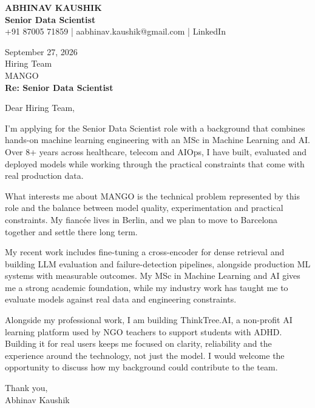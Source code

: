 \documentclass[10pt,a4paper]{article}
\begin{document}
\begin{center}
{\Large\bfseries ABHINAV KAUSHIK}\\[2pt]
{\bfseries Senior Data Scientist}\\[2pt]
+91 87005 71859 \quad | \quad aabhinav.kaushik@gmail.com \quad | \quad LinkedIn
\end{center}
\vspace{8pt}
September 27, 2026\\[6pt]
Hiring Team\\
MANGO\\[4pt]
\textbf{Re: Senior Data Scientist}

Dear Hiring Team,

I’m applying for the Senior Data Scientist role with a background that combines hands-on machine learning engineering with an MSc in Machine Learning and AI. Over 8+ years across healthcare, telecom and AIOps, I have built, evaluated and deployed models while working through the practical constraints that come with real production data.

What interests me about MANGO is the technical problem represented by this role and the balance between model quality, experimentation and practical constraints. My fiancée lives in Berlin, and we plan to move to Barcelona together and settle there long term.

My recent work includes fine-tuning a cross-encoder for dense retrieval and building LLM evaluation and failure-detection pipelines, alongside production ML systems with measurable outcomes. My MSc in Machine Learning and AI gives me a strong academic foundation, while my industry work has taught me to evaluate models against real data and engineering constraints.

Alongside my professional work, I am building ThinkTree.AI, a non-profit AI learning platform used by NGO teachers to support students with ADHD. Building it for real users keeps me focused on clarity, reliability and the experience around the technology, not just the model. I would welcome the opportunity to discuss how my background could contribute to the team.

Thank you,\\
Abhinav Kaushik
\end{document}
